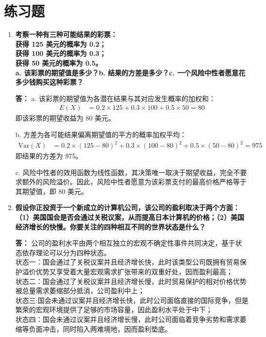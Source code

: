 	\section{练习题}
	\begin{enumerate}[label=\textbf{\arabic*.}, leftmargin=*]
		\item \textbf{考察一种有三种可能结果的彩票：\\获得 125 美元的概率为 0.2；\\获得 100 美元的概率为 0.3；\\获得 50 美元的概率为 0.5。\\a. 该彩票的期望值是多少？b. 结果的方差是多少？c. 一个风险中性者愿意花多少钱购买这种彩票？}
		
		\textbf{答：}
		a. 该彩票的期望值为各潜在结果与其对应发生概率的加权和：
		\[
		\begin{aligned}
			E(X) &= 0.2 \times 125 + 0.3 \times 100 + 0.5 \times 50 = 80
		\end{aligned}
		\]
		即该彩票的期望收益为 80 美元。
		
		b. 方差为各可能结果偏离期望值的平方的概率加权平均：
		\[
		\begin{aligned}
			\text{Var}(X) &= 0.2 \times (125 - 80)^2 + 0.3 \times (100 - 80)^2 + 0.5 \times (50 - 80)^2 = 975
		\end{aligned}
		\]
		即结果的方差为 975。
		
		c. 风险中性者的效用函数为线性函数，其决策唯一取决于期望收益，完全不要求额外的风险溢价。因此，风险中性者愿意为该彩票支付的最高价格严格等于其期望值，即 80 美元。
		
		\item \textbf{假设你正投资于一个新成立的计算机公司，该公司的盈利取决于两个方面：（1）美国国会是否会通过关税议案，从而提高日本计算机的价格；（2）美国经济增长的快慢。你要关注的四种相互不同的世界状态是什么？}
		
		\textbf{答：}
		公司的盈利水平由两个相互独立的宏观不确定性事件共同决定，基于状态依存理论可以分为四种状态。\\状态一：国会通过了关税议案并且经济增长快，此时该类型公司既拥有贸易保护溢价优势又享受着大量宏观需求扩张带来的双重好处，因而盈利最高；\\状态二：国会通过了关税议案并且经济增长慢，此时贸易保护的相对价格优势被总量需求萎缩部分抵消，公司盈利中上；\\状态三:国会未通过议案并且经济增长快，此时公司面临直接的国际竞争，但是繁荣的宏观环境提供了足够的市场容量，因此盈利水平处于中下；\\状态四：国会未通过议案并且经济增长慢，此时公司面临着竞争劣势和需求萎缩等负面冲击，同时陷入两难境地，因而盈利垫底。
		

\end{enumerate}
